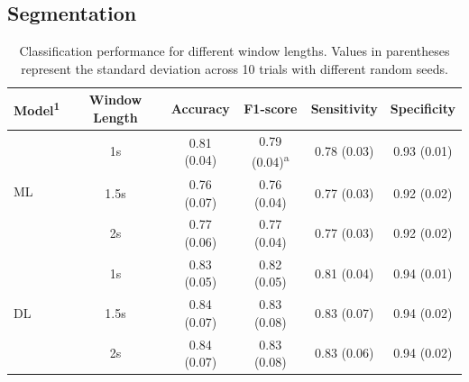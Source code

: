 \documentclass[sensors,article,submit,pdftex,moreauthors]{Definitions/mdpi}
\begin{document}
\textcolor{revision2}{\subsection{Segmentation}}

\begin{table}[htbp]
\centering
\caption{Classification performance for different window lengths. Values in parentheses represent the standard deviation across 10 trials with different random seeds.}
\begin{tabular}{lccccc}
\toprule
Model\textsuperscript{1} & Window Length &  Accuracy & F1-score & Sensitivity & Specificity \\
\midrule
\multirow{3}{*}{ML} 
  & 1s & 0.81 (0.04) & 0.79 (0.04)\textsuperscript{a} & 0.78 (0.03) & 0.93 (0.01) \\
  & 1.5s & 0.76 (0.07) & 0.76 (0.04) & 0.77 (0.03) & 0.92 (0.02) \\
  & 2s & 0.77 (0.06) & 0.77 (0.04) & 0.77 (0.03) & 0.92 (0.02) \\
\midrule
\multirow{3}{*}{DL} 
  & 1s & 0.83 (0.05) & 0.82 (0.05) & 0.81 (0.04) & 0.94 (0.01) \\
  & 1.5s & 0.84 (0.07) & 0.83 (0.08) & 0.83 (0.07) & 0.94 (0.02) \\
  & 2s & 0.84 (0.07) & 0.83 (0.08) & 0.83 (0.06) & 0.94 (0.02) \\
%   
%   
\bottomrule
\end{tabular}

\label{tab:sliding_window_analysis}
\end{table}
\end{document}
